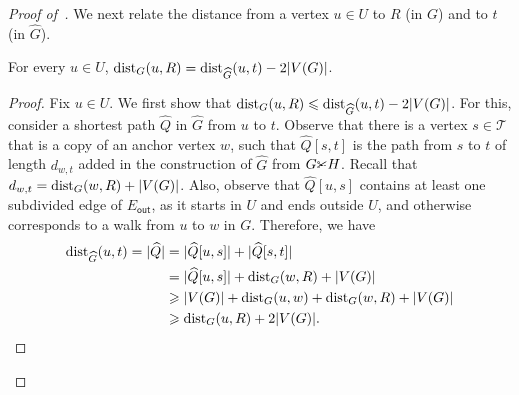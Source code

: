 \begin{proof}[Proof of~]
  We next relate the distance from a vertex $u\in U$ to $R$ (in $G$) and to $t$ (in $\widehat{G}$).
  \begin{claim}\label{cl:dist}
    For every $u\in U$, $\mathrm{dist}_G(u,R)=\mathrm{dist}_{\widehat{G}}(u,t) - 2|V(G)|$.
  \end{claim}
  \begin{proof}
    Fix $u\in U$.
    We first show that $\mathrm{dist}_G(u,R)\leqslant \mathrm{dist}_{\widehat{G}}(u,t) - 2|V(G)|$.
    For this, consider a shortest path $\widehat{Q}$ in $\widehat{G}$ from $u$ to $t$.
    Observe that there is a vertex $s\in\mathcal{T}$ that is a copy of an anchor vertex $w$,
    such that $\widehat{Q}[s,t]$ is the path from $s$ to $t$ of length $d_{w,t}$
    added in the construction of $\widehat{G}$ from $G\cutgraph H$. Recall that $d_{w,t} =\mathrm{dist}_G(w,R)+|V(G)|$.
    Also, observe that $\widehat{Q}[u,s]$ contains at least one subdivided edge of $E_{\mathsf{out}}$, as it starts
    in $U$ and ends outside $U$, and otherwise corresponds to a walk from $u$ to $w$ in $G$.
    Therefore, we have
    \begin{align*}
      \mathrm{dist}_{\widehat{G}}(u,t)  = |\widehat{Q}| & = |\widehat{Q}[u,s]|+|\widehat{Q}[s,t]|\\ 
        & = |\widehat{Q}[u,s]| + \mathrm{dist}_G(w,R)+|V(G)|\\
        & \geqslant |V(G)| + \mathrm{dist}_G(u, w) + \mathrm{dist}_G(w,R) + |V(G)|\\
        & \geqslant \mathrm{dist}_G(u,R) + 2|V(G)|.
    \end{align*}
    

\end{proof}
\end{proof}
